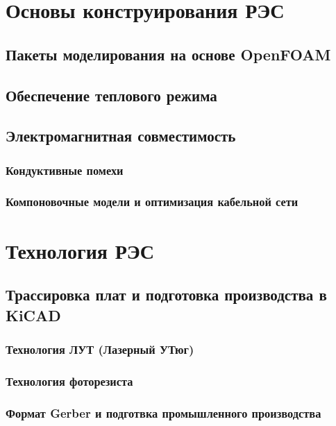 \part{Основы конструирования РЭС}

\chapter{Пакеты моделирования на основе OpenFOAM}

\chapter{Обеспечение теплового режима}

\chapter{Электромагнитная совместимость}

\section{Кондуктивные помехи}

\section{Компоновочные модели и оптимизация кабельной сети}

\part{Технология РЭС}

\chapter{Трассировка плат и подготовка производства в KiCAD}

\section{Технология ЛУТ (Лазерный УТюг)}

\section{Технология фоторезиста}

\section{Формат Gerber и подготвка промышленного производства}

